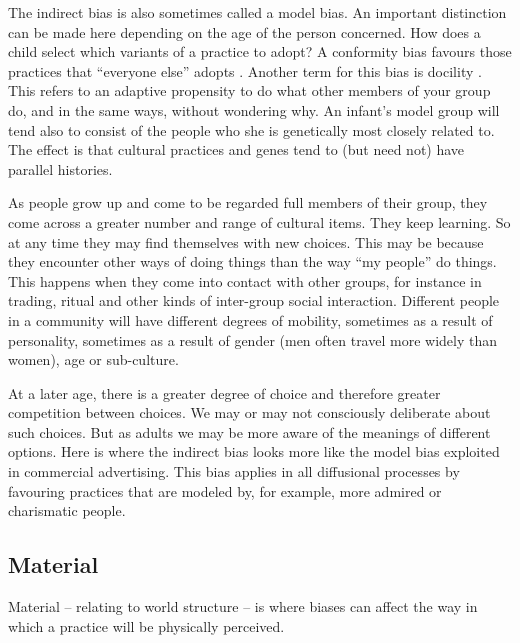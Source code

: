 The indirect bias is also sometimes called a model bias. An important distinction can be made here depending on the age 
of the person concerned. How does a child select which variants of a 
practice to adopt? A conformity bias favours those practices that 
``everyone else'' adopts \citep{boyd_culture_1985,gergely_sylvias_2006}. Another term for this bias is docility \citep{simon_mechanism_1990}. This refers to an 
adaptive propensity to do what other 
members of your group do, and in the same ways, without wondering why. An infant's model group will tend also to 
consist of the people who she is genetically most closely related to. 
The effect is that cultural practices and genes tend to (but need not) have 
parallel histories. 

As people grow up and come to be regarded full members of their group, they come across a greater number and range of cultural items. They keep learning. So at any time they may 
find themselves with new choices. This may be because they 
encounter other ways of doing things than the way ``my people'' do things. This happens when they come into contact with other groups, for instance in trading, 
ritual and other kinds of inter-group social interaction. Different 
people in a community will have different degrees of mobility, sometimes as a result of 
personality, sometimes as a result of gender (men often travel more 
widely than women), age or sub-culture. 



At a later age, there is a greater degree of choice and therefore 
greater competition between choices. We may or may not consciously 
deliberate about such choices. But as adults we may be more aware of the 
meanings of different options. Here is where the indirect bias looks 
more like the model bias exploited in commercial advertising. This bias applies in 
all diffusional processes by favouring practices 
that are modeled by, for example, more admired or charismatic people.


\subsection{Material}
Material -- relating to world structure -- is where biases can 
affect the way in which a practice will be physically perceived. 



